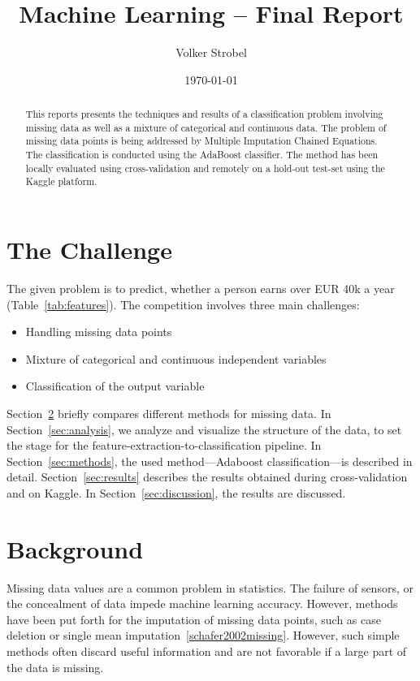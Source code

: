 \documentclass{article}
\title{Machine Learning -- Final Report}
\author{Volker Strobel}
\date{\today}
\begin{document}
\maketitle

\begin{abstract}
  This reports presents the techniques and results of a classification
  problem involving missing data as well as a mixture of categorical
  and continuous data. The problem of missing data points is being
  addressed by Multiple Imputation Chained Equations. The
  classification is conducted using the AdaBoost classifier. The
  method has been locally evaluated using cross-validation and
  remotely on a hold-out test-set using the Kaggle platform.
\end{abstract}

\section{The Challenge}
\label{sec:introduction}

The given problem is to predict, whether a person earns over EUR 40k a
year (Table~\ref{tab:features}). The competition involves three main
challenges:
\begin{itemize}
\item Handling missing data points
\item Mixture of categorical and continuous independent variables
\item Classification of the output variable
\end{itemize}

Section~\ref{sec:background} briefly compares different methods for
missing data. In Section~\ref{sec:analysis}, we analyze and visualize
the structure of the data, to set the stage for the
feature-extraction-to-classification pipeline. In
Section~\ref{sec:methods}, the used method---Adaboost
classification---is described in detail. Section~\ref{sec:results}
describes the results obtained during cross-validation and on
Kaggle. In Section~\ref{sec:discussion}, the results are discussed.

\section{Background}
\label{sec:background}

Missing data values are a common problem in statistics. The failure of
sensors, or the concealment of data impede machine learning
accuracy. However, methods have been put forth for the imputation of
missing data points, such as case deletion or single mean
imputation~\ref{schafer2002missing}. However, such simple methods
often discard useful information and are not favorable if a large part
of the data is missing.
\end{document}
